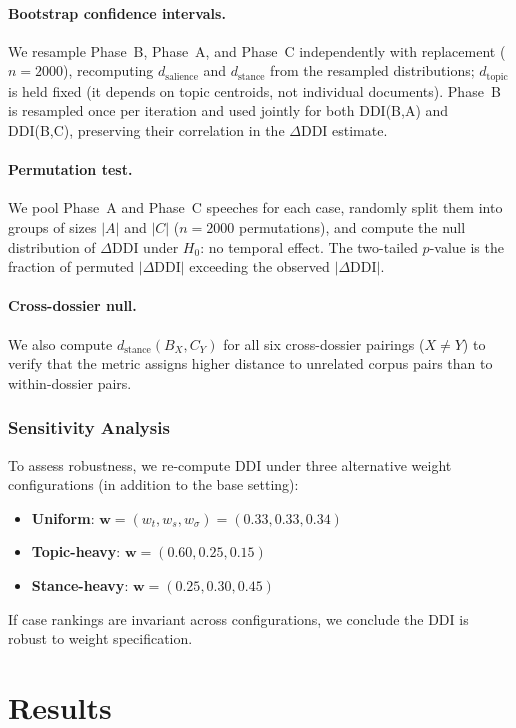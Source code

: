 \documentclass[sigconf,natbib]{acmart}
\begin{document}
\paragraph{Bootstrap confidence intervals.}
We resample Phase~B, Phase~A, and Phase~C independently with replacement ($n=2000$),
recomputing $d_{\text{salience}}$ and $d_{\text{stance}}$ from the resampled distributions;
$d_{\text{topic}}$ is held fixed (it depends on topic centroids, not individual documents).
Phase~B is resampled once per iteration and used jointly for both DDI(B,A) and DDI(B,C),
preserving their correlation in the $\Delta$DDI estimate.

\paragraph{Permutation test.}
We pool Phase~A and Phase~C speeches for each case, randomly split them into groups
of sizes $|A|$ and $|C|$ ($n=2000$ permutations), and compute the null distribution of $\Delta$DDI
under $H_0$: no temporal effect. The two-tailed $p$-value is the fraction of permuted
$|\Delta\text{DDI}|$ exceeding the observed $|\Delta\text{DDI}|$.

\paragraph{Cross-dossier null.}
We also compute $d_{\text{stance}}(B_X, C_Y)$ for all six cross-dossier pairings
($X \neq Y$) to verify that the metric assigns higher distance to unrelated corpus
pairs than to within-dossier pairs.

\subsubsection{Sensitivity Analysis}
To assess robustness, we re-compute DDI under three alternative weight configurations
(in addition to the base setting):
\begin{itemize}
  \item \textbf{Uniform}: $\mathbf{w} = (w_t, w_s, w_\sigma) = (0.33, 0.33, 0.34)$
  \item \textbf{Topic-heavy}: $\mathbf{w} = (0.60, 0.25, 0.15)$
  \item \textbf{Stance-heavy}: $\mathbf{w} = (0.25, 0.30, 0.45)$
\end{itemize}
If case rankings are invariant across configurations, we conclude the DDI is robust to
weight specification.

\section{Results}
\end{document}
